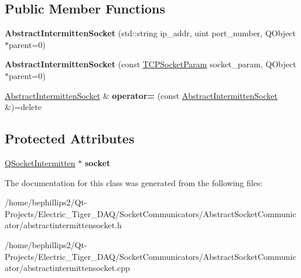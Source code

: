 \subsection*{Public Member Functions}
\begin{DoxyCompactItemize}
\item 
{\bfseries Abstract\+Intermitten\+Socket} (std\+::string ip\+\_\+addr, uint port\+\_\+number, Q\+Object $\ast$parent=0)\hypertarget{class_abstract_intermitten_socket_a6da643b4105a119af6e855bd2885656a}{}\label{class_abstract_intermitten_socket_a6da643b4105a119af6e855bd2885656a}

\item 
{\bfseries Abstract\+Intermitten\+Socket} (const \hyperlink{struct_t_c_p_socket_param}{T\+C\+P\+Socket\+Param} socket\+\_\+param, Q\+Object $\ast$parent=0)\hypertarget{class_abstract_intermitten_socket_ab16868d5b1dd0349c64d9ec5eae8707b}{}\label{class_abstract_intermitten_socket_ab16868d5b1dd0349c64d9ec5eae8707b}

\item 
\hyperlink{class_abstract_intermitten_socket}{Abstract\+Intermitten\+Socket} \& {\bfseries operator=} (const \hyperlink{class_abstract_intermitten_socket}{Abstract\+Intermitten\+Socket} \&)=delete\hypertarget{class_abstract_intermitten_socket_a2be6aa5fe81ced7c9f2ad7b32978d990}{}\label{class_abstract_intermitten_socket_a2be6aa5fe81ced7c9f2ad7b32978d990}

\end{DoxyCompactItemize}
\subsection*{Protected Attributes}
\begin{DoxyCompactItemize}
\item 
\hyperlink{class_q_socket_intermitten}{Q\+Socket\+Intermitten} $\ast$ {\bfseries socket}\hypertarget{class_abstract_intermitten_socket_af086bed84ba4bc6d5137d3c9486f0077}{}\label{class_abstract_intermitten_socket_af086bed84ba4bc6d5137d3c9486f0077}

\end{DoxyCompactItemize}


The documentation for this class was generated from the following files\+:\begin{DoxyCompactItemize}
\item 
/home/bephillips2/\+Qt-\/\+Projects/\+Electric\+\_\+\+Tiger\+\_\+\+D\+A\+Q/\+Socket\+Communicators/\+Abstract\+Socket\+Communicator/abstractintermittensocket.\+h\item 
/home/bephillips2/\+Qt-\/\+Projects/\+Electric\+\_\+\+Tiger\+\_\+\+D\+A\+Q/\+Socket\+Communicators/\+Abstract\+Socket\+Communicator/abstractintermittensocket.\+cpp\end{DoxyCompactItemize}
